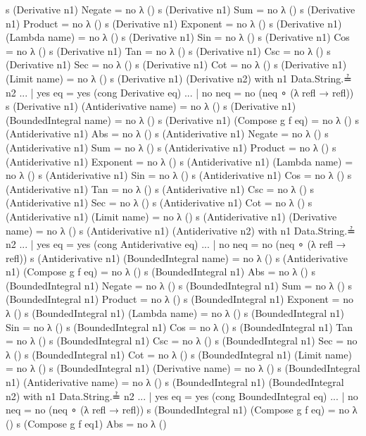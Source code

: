 \documentclass{report}
\begin{document}
\begin{code}
    s (Derivative n1) Negate = no λ ()
    s (Derivative n1) Sum = no λ ()
    s (Derivative n1) Product = no λ ()
    s (Derivative n1) Exponent = no λ ()
    s (Derivative n1) (Lambda name) = no λ ()
    s (Derivative n1) Sin = no λ ()
    s (Derivative n1) Cos = no λ ()
    s (Derivative n1) Tan = no λ ()
    s (Derivative n1) Csc = no λ ()
    s (Derivative n1) Sec = no λ ()
    s (Derivative n1) Cot = no λ ()
    s (Derivative n1) (Limit name) = no λ ()
    s (Derivative n1) (Derivative n2) with n1 Data.String.≟ n2
    ... | yes eq = yes (cong Derivative eq)
    ... | no neq = no (neq ∘ (λ {refl → refl}))
    s (Derivative n1) (Antiderivative name) = no λ ()
    s (Derivative n1) (BoundedIntegral name) = no λ ()
    s (Derivative n1) (Compose g f eq) = no λ ()
    s (Antiderivative n1) Abs = no λ ()
    s (Antiderivative n1) Negate = no λ ()
    s (Antiderivative n1) Sum = no λ ()
    s (Antiderivative n1) Product = no λ ()
    s (Antiderivative n1) Exponent = no λ ()
    s (Antiderivative n1) (Lambda name) = no λ ()
    s (Antiderivative n1) Sin = no λ ()
    s (Antiderivative n1) Cos = no λ ()
    s (Antiderivative n1) Tan = no λ ()
    s (Antiderivative n1) Csc = no λ ()
    s (Antiderivative n1) Sec = no λ ()
    s (Antiderivative n1) Cot = no λ ()
    s (Antiderivative n1) (Limit name) = no λ ()
    s (Antiderivative n1) (Derivative name) = no λ ()
    s (Antiderivative n1) (Antiderivative n2) with n1 Data.String.≟ n2
    ... | yes eq = yes (cong Antiderivative eq)
    ... | no neq = no (neq ∘ (λ {refl → refl}))
    s (Antiderivative n1) (BoundedIntegral name) = no λ ()
    s (Antiderivative n1) (Compose g f eq) = no λ ()
    s (BoundedIntegral n1) Abs = no λ ()
    s (BoundedIntegral n1) Negate = no λ ()
    s (BoundedIntegral n1) Sum = no λ ()
    s (BoundedIntegral n1) Product = no λ ()
    s (BoundedIntegral n1) Exponent = no λ ()
    s (BoundedIntegral n1) (Lambda name) = no λ ()
    s (BoundedIntegral n1) Sin = no λ ()
    s (BoundedIntegral n1) Cos = no λ ()
    s (BoundedIntegral n1) Tan = no λ ()
    s (BoundedIntegral n1) Csc = no λ ()
    s (BoundedIntegral n1) Sec = no λ ()
    s (BoundedIntegral n1) Cot = no λ ()
    s (BoundedIntegral n1) (Limit name) = no λ ()
    s (BoundedIntegral n1) (Derivative name) = no λ ()
    s (BoundedIntegral n1) (Antiderivative name) = no λ ()
    s (BoundedIntegral n1) (BoundedIntegral n2) with n1 Data.String.≟ n2
    ... | yes eq = yes (cong BoundedIntegral eq)
    ... | no neq = no (neq ∘ (λ {refl → refl}))
    s (BoundedIntegral n1) (Compose g f eq) = no λ ()
    s (Compose g f eq1) Abs = no λ ()

\end{code}
\end{document}
